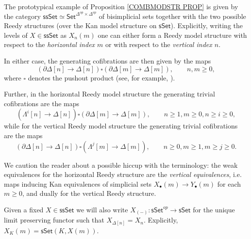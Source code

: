 \documentclass[a4paper,10pt
 ,draft
]{article}%
\begin{document}
The prototypical example of Proposition \ref{COMBMODSTR PROP} is given by the category 
$\mathsf{ssSet} \simeq \mathsf{Set}^{\Delta^{op} \times \Delta^{op}}$
of bisimplicial sets together with the two possible Reedy structures (over the Kan model structure on $\mathsf{sSet}$).
Explicitly, writing the levels of 
$X \in \mathsf{ssSet}$ as $X_n(m)$
one can either form a Reedy model structure with respect to the 
\textit{horizontal index $m$}
or with respect to the 
\textit{vertical index $n$}.

In either case, the generating cofibrations are then given by the maps
\[
	\left( \partial \Delta[n] \to \Delta[n] \right)
\square
	\left( \partial \Delta[m] \to \Delta[m] \right),
	\qquad n,m\geq 0,
\]
where $\square$ denotes the pushout product (see, for example, \cite[11.1.7]{Ri14}).

Further, in the horizontal Reedy model structure the generating trivial cofibrations are the maps
\begin{equation}\label{GTRCOHOR EQ}
	\left( \Lambda^i[n] \to \Delta[n] \right)
\square
	\left( \partial \Delta[m] \to \Delta[m] \right),
\qquad n \geq 1, m\geq 0, n \geq i \geq 0,
\end{equation}
while for the vertical Reedy model structure the generating trivial cofibrations are the maps
\begin{equation}\label{GTRCOVER EQ}
	\left( \partial \Delta[n] \to \Delta[n] \right)
\square
	\left( \Lambda^j[m] \to \Delta[m] \right),
\qquad n\geq 0, m\geq 1,m\geq j \geq 0.
\end{equation}

We caution the reader about a possible hiccup with the terminology: 
the weak equivalences for the horizontal Reedy structure are the 
\textit{vertical equivalences},
i.e. maps inducing Kan equivalences of simplicial sets
$X_{\bullet}(m) \to Y_{\bullet}(m)$
for each $m \geq 0$, and dually for the vertical Reedy structure.

\begin{notation}\label{UNIQUELIM NOT}
	Given a fixed $X \in \mathsf{ssSet}$ we will also write
	$X_{(-)} \colon \mathsf{sSet}^{op} \to \mathsf{sSet}$
	for the unique limit preserving functor such that
	$X_{\Delta[n]} = X_n$.
	Explicitly, $X_K(m) = \mathsf{sSet}(K,X(m))$.
	
\end{notation}
\end{document}
